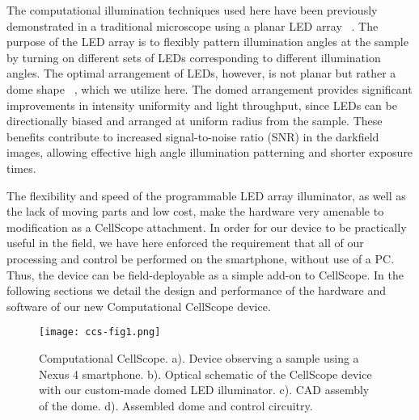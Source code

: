 {The computational illumination techniques used here have been previously demonstrated in a traditional microscope using a planar LED array ~\cite{Zheng2011,Zheng2013,Tian14,zijiMulti,tian20153d}. The purpose of the LED array is to flexibly pattern illumination angles at the sample by turning on different sets of LEDs corresponding to different illumination angles. The optimal arrangement of LEDs, however, is not planar but rather a dome shape ~\cite{Dominguez:14}, which we utilize here. The domed arrangement provides significant improvements in intensity uniformity and light throughput, since LEDs can be directionally biased and arranged at uniform radius from the sample. These benefits contribute to increased signal-to-noise ratio (SNR) in the darkfield images, allowing effective high angle illumination patterning and shorter exposure times.

The flexibility and speed of the programmable LED array illuminator, as well as the lack of moving parts and low cost, make the hardware very amenable to modification as a CellScope attachment. In order for our device to be practically useful in the field, we have here enforced the requirement that all of our processing and control be performed on the smartphone, without use of a PC. Thus, the device can be field-deployable as a simple add-on to CellScope. In the following sections we detail the design and performance of the hardware and software of our new Computational CellScope device.

\begin{figure} [h]
\begin{center}
\texttt{[image: ccs-fig1.png]}
\end{center}
\caption {{Computational CellScope.} {a).} Device observing a sample using a Nexus 4 smartphone. {b).} Optical schematic of the CellScope device with our custom-made domed LED illuminator. {c).} CAD assembly of the dome. {d).} Assembled dome and control circuitry.}
\label{fig:device}
\end{figure}

}
